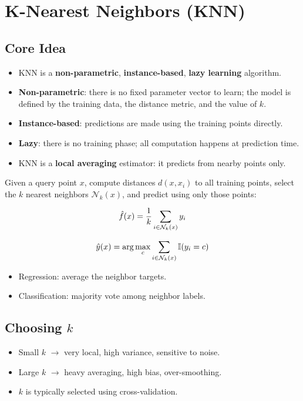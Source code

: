\documentclass[10pt,a4paper]{article}
\begin{document}
		\section{K-Nearest Neighbors (KNN)}
	
		\subsection{Core Idea}
		\begin{itemize}
			\item KNN is a \textbf{non-parametric}, \textbf{instance-based}, \textbf{lazy learning} algorithm.
			\item \textbf{Non-parametric}: there is no fixed parameter vector to learn; the model is defined by the training data, the distance metric, and the value of $k$.
			\item \textbf{Instance-based}: predictions are made using the training points directly.
			\item \textbf{Lazy}: there is no training phase; all computation happens at prediction time.
			\item KNN is a \textbf{local averaging} estimator: it predicts from nearby points only.
		\end{itemize}
	

		Given a query point $x$, compute distances $d(x, x_i)$ to all training points, select the $k$ nearest neighbors $\mathcal{N}_k(x)$, and predict using only those points:
	
		\begin{align*}
			\Large \hat f(x)=\frac{1}{k}\sum_{i \in \mathcal{N}_k(x)} y_i
		\end{align*}
	
		\begin{align*}
			\Large \hat y(x)=\arg\max_{c}\sum_{i \in \mathcal{N}_k(x)} \mathbb{I}(y_i = c)
		\end{align*}
	
		\begin{itemize}
			\item Regression: average the neighbor targets.
			\item Classification: majority vote among neighbor labels.
		\end{itemize}
	
		\subsection{Choosing $k$}
		\begin{itemize}
			\item Small $k$ $\rightarrow$ very local, high variance, sensitive to noise.
			\item Large $k$ $\rightarrow$ heavy averaging, high bias, over-smoothing.
			\item $k$ is typically selected using cross-validation.
		\end{itemize}
	
\end{document}
